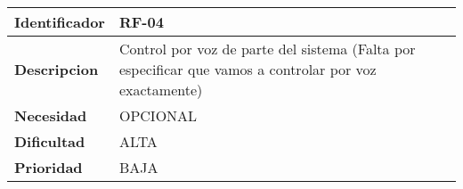 \begin{center}
    \begin{tabular}{|p{2.6cm}|p{12cm}|}
    \hline
    \textbf{Identificador} & RF-04\\
    \hline
    \textbf{Descripcion} & Control por voz de parte del sistema (Falta por especificar que vamos a controlar por voz exactamente)\\
    \hline
    \textbf{Necesidad} & OPCIONAL\\
    \hline
    \textbf{Dificultad} & ALTA\\
    \hline
    \textbf{Prioridad} & BAJA\\
    \hline
    \end{tabular}
\end{center}
